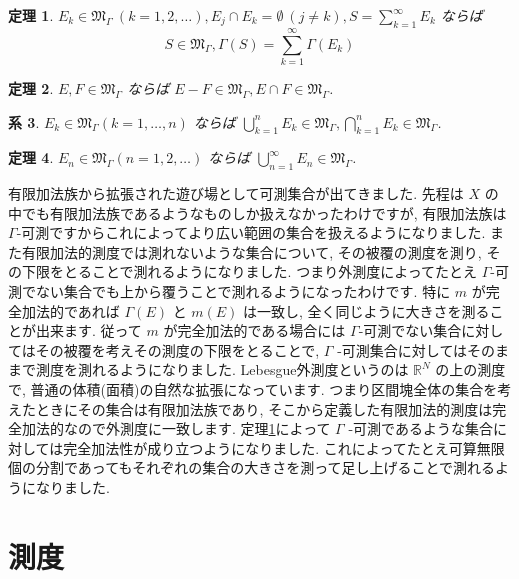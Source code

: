 \documentclass[dvipdfmx]{jsreport}
\newtheorem{theo}{定理}[section]
\newtheorem{corr}[theo]{系}
\begin{document}
\begin{theo} \label{gamma_measure_property}
    $\displaystyle E_k \in \mathfrak{M}_\Gamma \ (k = 1, 2, \dots), E_j \cap E_k = \emptyset \ (j \neq k), S = \sum_{k = 1}^\infty E_k$ ならば
    \begin{equation}
        S \in \mathfrak{M}_\Gamma, \Gamma(S) = \sum_{k = 1}^\infty \Gamma(E_k)
    \end{equation}
\end{theo}

\begin{theo}
    $E, F \in \mathfrak{M}_\Gamma$ ならば $E - F \in \mathfrak{M}_\Gamma, E \cap F \in \mathfrak{M}_\Gamma$. 
\end{theo}

\begin{corr}
    $E_k \in \mathfrak{M}_\Gamma (k = 1, \dots, n)$ ならば $\displaystyle \bigcup_{k = 1}^n E_k \in \mathfrak{M}_\Gamma, \bigcap_{k = 1}^n E_k \in \mathfrak{M}_\Gamma$. 
\end{corr}

\begin{theo}
    $E_n \in \mathfrak{M}_\Gamma (n = 1, 2, \dots)$ ならば $\displaystyle \bigcup_{n = 1}^\infty E_n \in \mathfrak{M}_\Gamma$. 
\end{theo}

有限加法族から拡張された遊び場として可測集合が出てきました. 先程は $X$ の中でも有限加法族であるようなものしか扱えなかったわけですが, 有限加法族は $\Gamma$-可測ですからこれによってより広い範囲の集合を扱えるようになりました. 
また有限加法的測度では測れないような集合について, その被覆の測度を測り, その下限をとることで測れるようになりました. つまり外測度によってたとえ $\Gamma$-可測でない集合でも上から覆うことで測れるようになったわけです. 
特に $m$ が完全加法的であれば $\Gamma(E)$ と $m(E)$ は一致し, 全く同じように大きさを測ることが出来ます. 従って $m$ が完全加法的である場合には $\Gamma$-可測でない集合に対してはその被覆を考えその測度の下限をとることで, $\Gamma$ -可測集合に対してはそのままで測度を測れるようになりました. 
Lebesgue外測度というのは $\mathbb{R}^N$ の上の測度で, 普通の体積(面積)の自然な拡張になっています. つまり区間塊全体の集合を考えたときにその集合は有限加法族であり, そこから定義した有限加法的測度は完全加法的なので外測度に一致します. 
定理\ref{gamma_measure_property}によって $\Gamma$ -可測であるような集合に対しては完全加法性が成り立つようになりました. これによってたとえ可算無限個の分割であってもそれぞれの集合の大きさを測って足し上げることで測れるようになりました. 

\section{測度}
\end{document}
